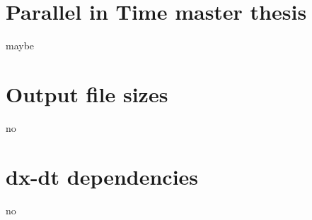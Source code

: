 

\section{Parallel in Time master thesis}
maybe
\section{Output file sizes}
no
\section{dx-dt dependencies} 
no
